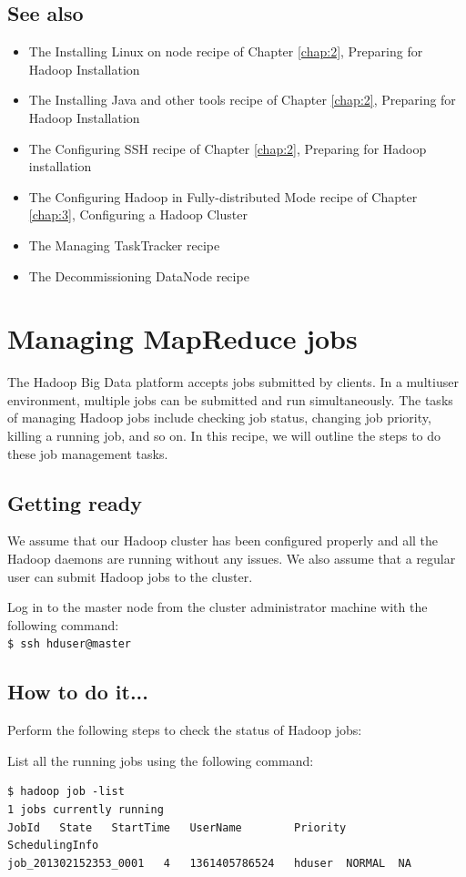 \subsection*{See also}
\begin{itemize}
  \item The Installing Linux on node recipe of Chapter \ref{chap:2}, Preparing for Hadoop Installation
  \item The Installing Java and other tools recipe of Chapter \ref{chap:2}, Preparing for Hadoop Installation
  \item The Configuring SSH recipe of Chapter \ref{chap:2}, Preparing for Hadoop installation
  \item The Configuring Hadoop in Fully-distributed Mode recipe of Chapter \ref{chap:3}, Configuring a Hadoop Cluster
  \item The Managing TaskTracker recipe
  \item The Decommissioning DataNode recipe
\end{itemize}

\section{Managing MapReduce jobs}
The Hadoop Big Data platform accepts jobs submitted by clients. In a multiuser environment, multiple jobs can be submitted and run simultaneously. The tasks of managing Hadoop jobs include checking job status, changing job priority, killing a running job, and so on. In this recipe, we will outline the steps to do these job management tasks.
\subsection*{Getting ready}
We assume that our Hadoop cluster has been configured properly and all the Hadoop daemons are running without any issues. We also assume that a regular user can submit Hadoop jobs to the cluster.

Log in to the master node from the cluster administrator machine with the following command:\\
\verb|$ ssh hduser@master|
\subsection*{How to do it...}
Perform the following steps to check the status of Hadoop jobs:

List all the running jobs using the following command: 
\lstset{style=bashstyle}
\begin{lstlisting}
$ hadoop job -list
1 jobs currently running
JobId   State   StartTime   UserName        Priority        SchedulingInfo
job_201302152353_0001   4   1361405786524   hduser  NORMAL  NA
\end{lstlisting}

